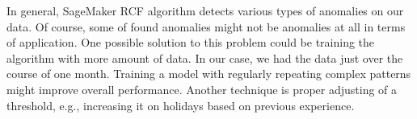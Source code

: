     In general, SageMaker RCF algorithm detects various types of anomalies on our data. Of course, some of found anomalies might not be anomalies at all in terms of application. One possible solution to this problem could be training the algorithm with more amount of data. In our case, we had the data just over the course of one month. Training a model with regularly repeating complex patterns might improve overall performance. Another technique is proper adjusting of a threshold, e.g., increasing it on holidays based on previous experience. 
   


